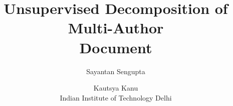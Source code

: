 \documentclass[letterpaper]{article}
\begin{document}
%
\title{Unsupervised Decomposition of Multi-Author \\Document}
\author{Sayantan Sengupta \and   Kautsya Kanu\\ 
Indian Institute of Technology Delhi\\
}
\maketitle
\end{document}
